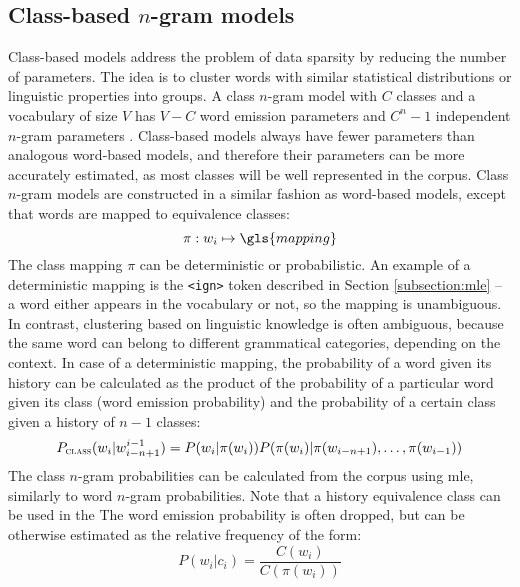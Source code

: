 	\subsection{Class-based \mbox{$n$-gram} models}
	\label{subsection:class}
	Class-based models address the problem of data sparsity by reducing the number of parameters. The idea is to cluster words with similar statistical distributions or linguistic properties into groups. A class \mbox{$n$-gram} model with $C$ classes and a vocabulary of size $V$ has $V-C$ word emission parameters and $C^{n}-1$ independent \mbox{$n$-gram} parameters \cite{brown1992class}. Class-based models always have fewer parameters than analogous word-based models, and therefore their parameters can be more accurately estimated, as most classes will be well represented in the corpus. Class \mbox{$n$-gram} models are constructed in a similar fashion as word-based models, except that words are mapped to equivalence classes: 
	\begin{equation}
		\pi:w_{i}\mapsto \gls{mapping}
		\label{equation:deterministic_class}
	\end{equation}
	The class mapping $\pi$ can be deterministic or probabilistic. An example of a deterministic mapping is the \texttt{<ign>} token described in Section \ref{subsection:mle} -- a word either appears in the vocabulary or not, so the mapping is unambiguous. In contrast, clustering based on linguistic knowledge is often ambiguous, because the same word can belong to different grammatical categories, depending on the context. 
	In case of a deterministic mapping, the probability of a word given its history can be calculated as the product of the probability of a particular word given its class (word emission probability) and the probability of a certain class given a history of $n-1$ classes:
	\begin{equation}
		P_{\textsc{class}}(w_{i}|w_{i-n+1}^{i-1})=P(w_{i}|\pi(w_{i}))P(\pi(w_{i})|\pi(w_{i-n+1}), \dots, \pi(w_{i-1}))
		\label{equation:classngram}
	\end{equation}
	The class \mbox{$n$-gram} probabilities can be calculated from the corpus using \gls{mle}, similarly to word \mbox{$n$-gram} probabilities. Note that a history equivalence class can be used in the The word emission probability is often dropped, but can be otherwise estimated as the relative frequency of the form:
	\begin{equation}
		P(w_{i}|c_{i})=\frac{C(w_{i})}{C(\pi(w_{i}))}
		\label{equation:emission_probability}
	\end{equation}
